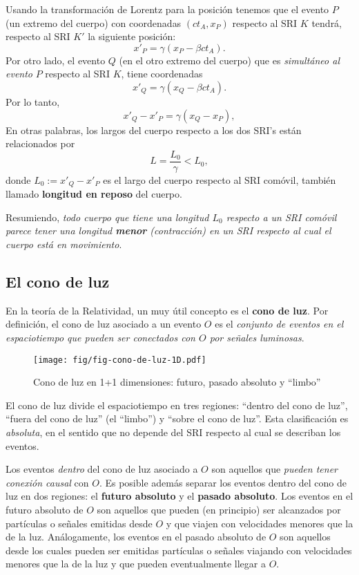  Usando la transformación de Lorentz para la posición tenemos que el evento $P$ (un extremo del cuerpo) con coordenadas $(ct_A,x_P)$ respecto al SRI $K$ tendrá, respecto al SRI $K'$ la siguiente posición:
\begin{equation}
x'_P=\gamma(x_P-\beta c t_A).
\end{equation}
Por otro lado, el evento $Q$ (en el otro extremo del cuerpo) que es \textit{simultáneo al evento} $P$ respecto al SRI $K$, tiene coordenadas
\begin{equation}
x'_Q=\gamma(x_Q-\beta c t_A).
\end{equation}
Por lo tanto,
\begin{equation}
x'_Q-x'_P=\gamma(x_Q-x_P),
\end{equation}
En otras palabras, los largos del cuerpo respecto a los dos SRI's están relacionados por
\begin{equation}
L=\frac{L_0}{\gamma}<L_0,
\end{equation}
donde $L_0:=x'_Q-x'_P$ es el largo del cuerpo respecto al SRI comóvil, también llamado \textbf{longitud en reposo} del cuerpo.

Resumiendo, \textit{todo cuerpo que tiene una longitud $L_0$ respecto a un SRI comóvil parece tener una longitud \textbf{menor} (contracción) en un SRI respecto al cual el cuerpo está en movimiento}.

\subsection{El cono de luz}
En la teoría de la Relatividad, un muy útil concepto es el \textbf{cono de luz}. Por definición, el cono de luz asociado a un evento $O$ es el \textit{conjunto de eventos en el espaciotiempo que pueden ser conectados con $O$ por señales luminosas}.
\begin{figure}[!h]
\centerline{\texttt{[image: fig/fig-cono-de-luz-1D.pdf]}}
 \caption{Cono de luz en 1+1 dimensiones: futuro, pasado absoluto y ``limbo''}
\label{lc}
\end{figure}
El cono de luz divide el espaciotiempo en tres regiones: ``dentro del cono de luz'', ``fuera del cono de luz'' (el ``limbo'') y ``sobre el cono de luz''. Esta clasificación es \textit{absoluta}, en el sentido que no depende del SRI respecto al cual se describan los eventos.

Los eventos \textit{dentro} del cono de luz asociado a $O$ son aquellos que \textit{pueden tener conexión causal} con $O$. Es posible además separar los eventos dentro del cono de luz en dos regiones: el \textbf{futuro absoluto} y el \textbf{pasado absoluto}. Los eventos en el futuro absoluto de $O$ son aquellos que pueden (en principio) ser alcanzados por partículas o señales emitidas desde  $O$  y que viajen con velocidades menores que la de la luz. Análogamente, los eventos en el pasado absoluto de $O$ son aquellos desde los cuales pueden ser emitidas partículas o señales viajando con velocidades menores que la de la luz y que pueden eventualmente llegar a $O$. 

